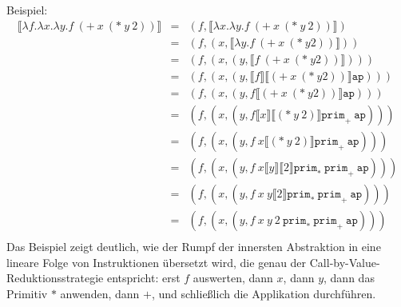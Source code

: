 Beispiel:
%
\begin{eqnarray*}
  \llbracket \lambda f.\lambda x.\lambda y.f~(+~x~(*~y~2))\rrbracket
  &=&
  (f, \llbracket \lambda x.\lambda y.f~(+~x~(*~y~2))\rrbracket)\\
  &=&
  (f, (x, \llbracket \lambda y.f~(+~x~(*~y 2))\rrbracket))\\
  &=&
  (f, (x, (y, \llbracket f~(+~x~(*~y 2))\rrbracket)))\\
  &=&
  (f, (x, (y, \llbracket f\rrbracket \llbracket (+~x~(*~y
  2))\rrbracket \mathtt{ap})))\\
  &=&
  (f, (x, (y, f \llbracket (+~x~(*~y 2))\rrbracket\mathtt{ap})))\\
  &=&
  (f, (x, (y, f \llbracket x\rrbracket \llbracket (*~y~2)\rrbracket \mathtt{prim}_+~\mathtt{ap})))\\
  &=&
  (f, (x, (y, f~x \llbracket (*~y~2)\rrbracket \mathtt{prim}_+~\mathtt{ap})))\\
  &=&
  (f, (x, (y, f~x \llbracket y\rrbracket \llbracket 2\rrbracket \mathtt{prim}_*~\mathtt{prim}_+~\mathtt{ap})))\\
  &=&
  (f, (x, (y, f~x~y \llbracket 2\rrbracket \mathtt{prim}_*~\mathtt{prim}_+~\mathtt{ap})))\\
  &=&
  (f, (x, (y, f~x~y~2~\mathtt{prim}_*~\mathtt{prim}_+~\mathtt{ap})))\\
\end{eqnarray*}
%
Das Beispiel zeigt deutlich, wie der Rumpf der innersten Abstraktion
in eine lineare Folge von Instruktionen übersetzt wird, die genau der
Call-by-Value-Reduktionsstrategie entspricht: erst $f$ auswerten, dann
$x$, dann $y$, dann das Primitiv $*$ anwenden, dann $+$, und
schließlich die Applikation durchführen.

